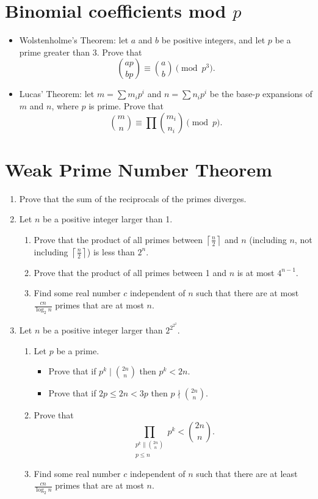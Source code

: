 \documentclass{article}
\begin{document}
\section{Binomial coefficients mod $p$}
\begin{itemize}
	\item Wolstenholme's Theorem:
	      let $a$ and $b$ be positive integers, and let $p$ be a prime greater
	      than 3. Prove that \[\binom{ap}{bp}\equiv\binom ab\pmod {p^3}.\]
	\item Lucas' Theorem: let $m=\sum m_i p^i$ and $n=\sum n_i p^i$ be the base-$p$ expansions of
	      $m$ and $n$, where $p$ is prime. Prove that
	      \[\binom mn\equiv\prod{\binom{m_i}{n_i}}\pmod p.\]
\end{itemize}
\section{Weak Prime Number Theorem}
\begin{enumerate}
	\item Prove that the sum of the reciprocals of the primes diverges.
	\item
	      Let $n$ be a positive integer larger than 1.
	      \begin{enumerate}
		      \item Prove that the product of all primes between $\left\lceil\frac
			            n2\right\rceil$ and $n$
		            (including $n$, not including $\left\lceil\frac n2\right\rceil$)
		            is less than
		            $2^n$.
		      \item Prove that the product of all primes between 1 and $n$ is at most
		            $4^{n-1}$.
		      \item Find some real number $c$ independent of $n$ such that there are at
		            most $\frac{cn}{\log_2 n}$ primes that are at most $n$.
	      \end{enumerate}
	\item
	      Let $n$ be a positive integer larger than $2^{2^{2^2}}$.
	      \begin{enumerate}
		      \item Let $p$ be a prime.
		            \begin{itemize}
			            \item Prove that if $p^k\mid\binom{2n}n$ then $p^k<
				                  2n$.
			            \item Prove that if $2p\le 2n< 3p$ then $p\nmid\binom{2n}n$.
		            \end{itemize}
		      \item Prove that
		            \[\prod_{\substack{p^k\|\binom{2n}n\\ p\le n}}p^k<\binom{2n}n.\]
		      \item Find some real number $c$ independent of $n$ such that there are at
		            least $\frac{cn}{\log_2 n}$ primes that are at most $n$.
	      \end{enumerate}
\end{enumerate}
\end{document}
